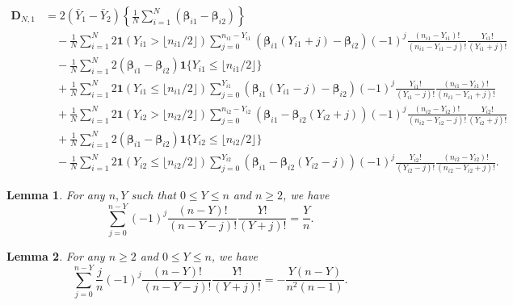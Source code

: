 \documentclass[10pt,a4paper]{amsart}
\newtheorem{lemma}{Lemma}
\begin{document}
\begin{equation}\label{eq:coefficient:linear:ML:two-sample}
\begin{array}{rl}
    \mathbf{D}_{N,1}\!\!\!\!\!\!&\displaystyle=2(\bar{Y}_1-\bar{Y}_2)\left\{\frac{1}{N}\sum_{i=1}^N(\boldsymbol{\beta}_{i1}-\boldsymbol{\beta}_{i2})\right\}\\
    &\displaystyle\quad-\frac{1}{N}\sum_{i=1}^N2\mathbf{1}(Y_{i1} > \lfloor n_{i1}/2\rfloor)\!\!\!\sum_{j=0}^{n_{i1}-Y_{i1}}\!\!\!(\boldsymbol{\beta}_{i1}(Y_{i1}+j)-\boldsymbol{\beta}_{i2})(-1)^{j}\frac{(n_{i1}-Y_{i1})!}{(n_{i1}-Y_{i1}-j)!}\frac{Y_{i1}!}{(Y_{i1}+j)!}\\
    &\quad\displaystyle-\frac{1}{N}\sum_{i=1}^N2(\boldsymbol{\beta}_{i1}-\boldsymbol{\beta}_{i2})\mathbf{1}\{Y_{i1}\leq \lfloor n_{i1}/2\rfloor\}\\
    &\quad\displaystyle+\frac{1}{N}\sum_{i=1}^N2\mathbf{1}(Y_{i1}\leq \lfloor n_{i1}/2\rfloor)\sum_{j=0}^{Y_{i1}}(\boldsymbol{\beta}_{i1}(Y_{i1}-j)-\boldsymbol{\beta}_{i2})(-1)^{j}\frac{Y_{i1}!}{(Y_{i1}-j)!}\frac{(n_{i1} - Y_{i1})!}{(n_{i1}-Y_{i1}+j)!}\\
    &\displaystyle\quad+\frac{1}{N}\sum_{i=1}^N2\mathbf{1}(Y_{i2} > \lfloor n_{i2}/2\rfloor)\!\!\!\sum_{j=0}^{n_{i2}-Y_{i2}}\!\!\!(\boldsymbol{\beta}_{i1}-\boldsymbol{\beta}_{i2}(Y_{i2}+j))(-1)^{j}\frac{(n_{i2}-Y_{i2})!}{(n_{i2}-Y_{i2}-j)!}\frac{Y_{i2}!}{(Y_{i2}+j)!}\\
    &\quad\displaystyle+\frac{1}{N}\sum_{i=1}^N2(\boldsymbol{\beta}_{i1}-\boldsymbol{\beta}_{i2})\mathbf{1}\{Y_{i2}\leq \lfloor n_{i2}/2\rfloor\}\\
    &\quad\displaystyle-\frac{1}{N}\sum_{i=1}^N2\mathbf{1}(Y_{i2}\leq \lfloor n_{i2}/2\rfloor)\sum_{j=0}^{Y_{i2}}(\boldsymbol{\beta}_{i1}-\boldsymbol{\beta}_{i2}(Y_{i2}-j))(-1)^{j}\frac{Y_{i2}!}{(Y_{i2}-j)!}\frac{(n_{i2} - Y_{i2})!}{(n_{i2}-Y_{i2}+j)!}.
\end{array}
\end{equation}

\begin{lemma}\label{lemma:combinatorics}
For any $n,Y$ such that $0\leq Y\leq n$ and $n\geq2$, we have  
$$\sum_{j=0}^{n-Y}(-1)^j\frac{(n-Y)!}{(n-Y-j)!}\frac{Y!}{(Y+j)!}=\frac{Y}{n}.$$
\end{lemma}

\begin{lemma}\label{lemma:combinatorics:2}
For any $n\geq2$ and $0\leq Y\leq n$, we have 
$$\sum_{j=0}^{n-Y}\frac{j}{n}(-1)^j\frac{(n-Y)!}{(n-Y-j)!}\frac{Y!}{(Y+j)!}=-\frac{Y(n-Y)}{n^2(n-1)}.$$
\end{lemma}
\end{document}
